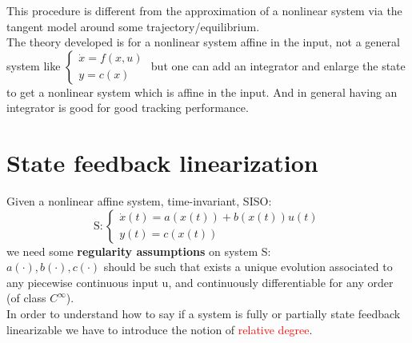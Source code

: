 \begin{remark}
		This procedure is different from the approximation of a nonlinear system via the tangent model around some trajectory/equilibrium.\\
		The theory developed is for a nonlinear system affine in the input, not a general system like $\begin{cases}
			\dot{x}=f(x,u)\\y=c(x)
		\end{cases}$ but one can add an integrator and enlarge the state to get a nonlinear system which is affine in the input. And in general having an integrator is good for good tracking performance.

\end{remark}
\section{State feedback linearization}
Given a nonlinear affine system, time-invariant, SISO:
\[\text{S}: \begin{cases}
	\dot{x}(t)=a(x(t))+b(x(t))u(t)\\
	y(t)=c(x(t))
\end{cases}
\] we need some \textbf{regularity assumptions} on system S:\\ $a(\cdot),b(\cdot),c(\cdot)$ should be such that exists a unique evolution associated to any piecewise continuous input u, and continuously differentiable for any order (of class $C^\infty$). \\
In order to understand how to say if a system is fully or partially state feedback linearizable we have to introduce the notion of \textcolor{red}{relative degree}.
